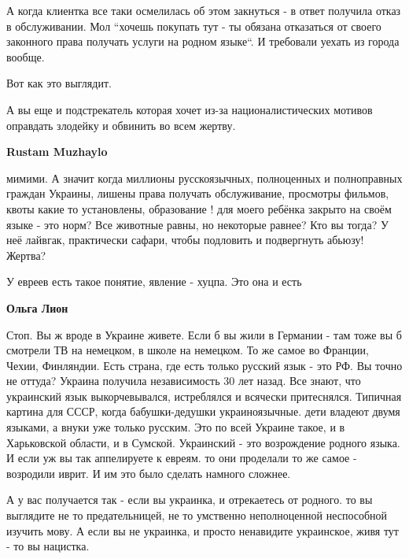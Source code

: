 \begin{itemize}
\begin{itemize}
А когда клиентка все таки осмелилась об этом закнуться - в ответ получила отказ
в обслуживании. Мол “хочешь покупать тут - ты обязана отказаться от своего
законного права получать услуги на родном языке“. И требовали уехать из города
вообще.

Вот как это выглядит.

А вы еще и подстрекатель которая хочет из-за националистических мотивов
оправдать злодейку и обвинить во всем жертву.

 
\textbf{Rustam Muzhaylo} 

мимими. А значит когда миллионы русскоязычных, полноценных и полноправных
граждан Украины, лишены права получать обслуживание, просмотры фильмов, квоты
какие то установлены, образование ! для моего ребёнка закрыто на своём языке -
это норм? Все животные равны, но некоторые равнее? Кто вы тогда? У неё лайвгак,
практически сафари, чтобы подловить и подвергнуть абьюзу! Жертва?

У евреев есть такое понятие, явление - хуцпа. Это она и есть


 
\textbf{Ольга Лион} 

Стоп. Вы ж вроде в Украине живете. Если б вы жили в Германии - там тоже вы б
смотрели ТВ на немецком, в школе на немецком. То же самое во Франции, Чехии,
Финляндии. Есть страна, где есть только русский язык - это РФ. Вы точно не
оттуда? Украина получила независимость 30 лет назад. Все знают, что украинский
язык выкорчевывался, истреблялся и всячески притеснялся. Типичная картина для
СССР, когда бабушки-дедушки украиноязычные. дети владеют двумя языками, а внуки
уже только русским. Это по всей Украине такое, и в Харьковской области, и в
Сумской. Украинский - это возрождение родного языка. И если уж вы так
аппелируете к евреям. то они проделали то же самое - возродили иврит. И им это
было сделать намного сложнее.

А у вас получается так - если вы украинка, и отрекаетесь от родного. то вы
выглядите не то предательницей, не то умственно неполноценной неспособной
изучить мову. А если вы не украинка, и просто ненавидите украинское, живя тут -
то вы нацистка.


\end{itemize}
\end{itemize}
